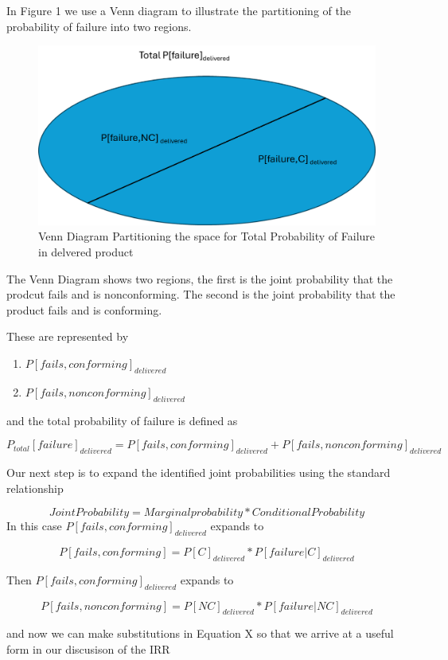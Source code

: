 \documentclass[
]{article}
\providecommand{\tightlist}{%
  \setlength{\itemsep}{0pt}\setlength{\parskip}{0pt}}
\begin{document}
In Figure 1 we use a Venn diagram to illustrate the partitioning of the probability of failure into two regions.

\begin{figure}

{\centering \includegraphics[width=0.5\linewidth]{Figure_1_IRR_Tutorial} 

}

\caption{Venn Diagram Partitioning the space for Total Probability of Failure in delvered product}\label{fig:unnamed-chunk-18}
\end{figure}

The Venn Diagram shows two regions, the first is the joint probability that the prodcut fails and is nonconforming. The second is the joint probability that the product fails and is conforming.

These are represented by

\begin{enumerate}
\def\labelenumi{\arabic{enumi}.}
\tightlist
\item
  \(P[fails,conforming]_{delivered}\)
\item
  \(P[fails,nonconforming]_{delivered}\)
\end{enumerate}

and the total probability of failure is defined as

\[
P_{total}[failure]_{delivered} = P[fails,conforming]_{delivered} + P[fails,nonconforming]_{delivered} \tag{1}
\]

Our next step is to expand the identified joint probabilities using the standard relationship

\[ Joint Probability = Marginal probability * Conditional Probability \]
In this case \(P[fails,conforming]_{delivered}\) expands to

\[ P[fails,conforming] = P[C]_{delivered} * P[failure|C]_{delivered} \]

Then \(P[fails,conforming]_{delivered}\) expands to

\[ P[fails,nonconforming] = P[NC]_{delivered} * P[failure|NC]_{delivered} \]

and now we can make substitutions in Equation X so that we arrive at a useful form in our discusison of the IRR
\end{document}
